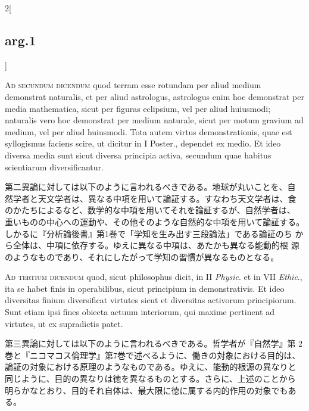 \documentclass[paper=a4paper,fontsize=10pt,jafontsize=9pt,titlepage]{jlreq}
\begin{document}
\begin{paracol}{2}[\subsection{arg.1}]
\switchcolumn*[\subsection{ad.2}]

{\scshape Ad secundum dicendum} quod terram esse rotundam per aliud
medium demonstrat naturalis, et per aliud astrologus, astrologus enim
hoc demonstrat per media mathematica, sicut per figuras eclipsium, vel
per aliud huiusmodi; naturalis vero hoc demonstrat per medium
naturale, sicut per motum gravium ad medium, vel per aliud
huiusmodi. Tota autem virtus demonstrationis, quae est syllogismus
faciens scire, ut dicitur in I Poster., dependet ex medio. Et ideo
diversa media sunt sicut diversa principia activa, secundum quae
habitus scientiarum diversificantur.

\switchcolumn

第二異論に対しては以下のように言われるべきである。地球が丸いことを、自
然学者と天文学者は、異なる中項を用いて論証する。すなわち天文学者は、食
のかたちによるなど、数学的な中項を用いてそれを論証するが、自然学者は、
重いものの中心への運動や、その他そのような自然的な中項を用いて論証する。
しかるに『分析論後書』第1巻で「学知を生み出す三段論法」である論証のち
から全体は、中項に依存する。ゆえに異なる中項は、あたかも異なる能動的根
源のようなものであり、それにしたがって学知の習慣が異なるものとなる。

\switchcolumn*[\subsection{ad.3}]

{\scshape Ad tertium dicendum} quod, sicut philosophus dicit, in II
{\itshape Physic}. et in VII {\itshape Ethic}., ita se habet finis in
operabilibus, sicut principium in demonstrativis. Et ideo diversitas
finium diversificat virtutes sicut et diversitas activorum
principiorum. Sunt etiam ipsi fines obiecta actuum interiorum, qui
maxime pertinent ad virtutes, ut ex supradictis patet.

\switchcolumn

第三異論に対しては以下のように言われるべきである。哲学者が『自然学』第
2巻と『ニコマコス倫理学』第7巻で述べるように、働きの対象における目的は、
論証の対象における原理のようなものである。ゆえに、能動的根源の異なりと
同じように、目的の異なりは徳を異なるものとする。さらに、上述のことから
明らかなとおり、目的それ自体は、最大限に徳に属する内的作用の対象でもあ
る。

\end{paracol}
\newpage
{}
{}
\setcounter{section}{3}
\setcounter{subsection}{0}
\end{document}
